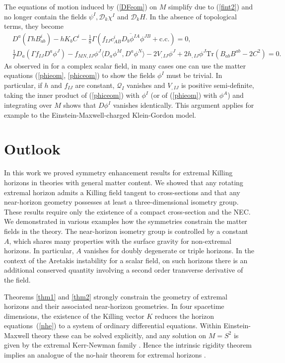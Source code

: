 \documentclass[11pt, reqno]{amsart}
\theoremstyle{plain}
\theoremstyle{definition}
\numberwithin{equation}{section}
\begin{document}
The equations of motion induced by (\ref{DFeom}) on $M$ simplify due to (\ref{fint2}) and no longer contain the fields $\psi^I, \mathcal{D}_k\chi^I$ and $\mathcal{D}_kH$. In the absence of topological terms, they become
\begin{subequations}
\begin{align}
    &D^a(\Gamma hB_{ab}^i) - hK_bC^i - \tfrac18 \Gamma \left(f_{IJ}c^i_{AB}\overline{D_b\phi^{IA}}\phi^{JB} + \text{c.c.}\right) = 0, \\
    &\frac{1}{\Gamma}D_a(\Gamma f_{IJ}D^a\phi^{J}) -  f_{MN,IJ}\phi^J\langle D_a\phi^M,D^a\phi^N\rangle - 2 V_{,IJ}\phi^{J} + 2 h_{,IJ}\phi^{J}\text{Tr}\left(B_{ab}B^{ab} - 2C^2\right) = 0. \label{phiceom}
\end{align}
\end{subequations}
As observed in \cite{LL16} for a  complex scalar field, in many cases one can use the matter equations (\ref{phieom}, \ref{phiceom}) to show the fields $\phi^I$ must be trivial. In particular, if $h$ and $f_{IJ}$ are constant, $\mathcal{Q}_I$ vanishes and $V_{,IJ}$ is positive semi-definite, taking the inner product of (\ref{phiceom}) with $\phi^I$ (or of (\ref{phieom}) with $\phi^A$) and integrating over $M$ shows that $D\phi^I$ vanishes identically. This argument applies for example to the Einstein-Maxwell-charged Klein-Gordon model.

\section{Outlook}
In this work we proved symmetry enhancement results for extremal Killing horizons in theories with general matter content. We showed that any rotating extremal horizon admits a Killing field tangent to cross-sections and that any near-horizon geometry possesses at least a three-dimensional isometry group. These results require only the existence of a compact cross-section and the NEC. We demonstrated in various examples how the symmetries constrain the matter fields in the theory. The near-horizon isometry group is controlled by a constant $A$, which shares many properties with the surface gravity for non-extremal horizons. In particular, $A$ vanishes for doubly degenerate or triple horizons. In the context of the Aretakis instability for a scalar field, on such horizons there is an additional conserved quantity involving a second order transverse derivative of the field. 

Theorems \ref{thm1} and \ref{thm2} strongly constrain the geometry of extremal horizons and their associated near-horizon geometries. In four spacetime dimensions, the existence of the Killing vector $K$ reduces the horizon equations~(\ref{nhe}) to a system of ordinary differential equations. Within Einstein-Maxwell theory these can be solved explicitly, and any solution on $M =S^2$ is given by the extremal Kerr-Newman family \cite{LP02,KL09}. Hence the intrinsic rigidity theorem implies an analogue of the no-hair theorem for extremal horizons \cite{DL,CKL}.
\end{document}
